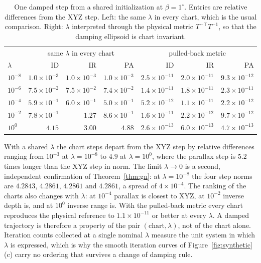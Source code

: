 \documentclass[11pt,a4paper]{article}
\theoremstyle{definition}
\theoremstyle{remark}
\begin{document}
\begin{table}[t]
\centering
\caption{One damped step from a shared initialization at $\beta=1^\circ$. Entries are relative differences from the XYZ step. Left: the same $\lambda$ in every chart, which is the usual comparison. Right: $\lambda$ interpreted through the physical metric $T^{-\top}T^{-1}$, so that the damping ellipsoid is chart invariant.}
\label{tab:damping}
\small
\begin{tabular}{lrrrrrr}
\toprule
& \multicolumn{3}{c}{same $\lambda$ in every chart} & \multicolumn{3}{c}{pulled-back metric}\\
\cmidrule(lr){2-4}\cmidrule(lr){5-7}
$\lambda$ & ID & IR & PA & ID & IR & PA\\
\midrule
$10^{-8}$ & $1.0\times10^{-3}$ & $1.0\times10^{-3}$ & $1.0\times10^{-3}$ & $2.5\times10^{-11}$ & $2.0\times10^{-11}$ & $9.3\times10^{-12}$\\
$10^{-6}$ & $7.5\times10^{-2}$ & $7.5\times10^{-2}$ & $7.4\times10^{-2}$ & $1.4\times10^{-11}$ & $1.8\times10^{-11}$ & $2.3\times10^{-11}$\\
$10^{-4}$ & $5.9\times10^{-1}$ & $6.0\times10^{-1}$ & $5.0\times10^{-1}$ & $5.2\times10^{-12}$ & $1.1\times10^{-11}$ & $2.2\times10^{-12}$\\
$10^{-2}$ & $7.8\times10^{-1}$ & $1.27$ & $8.6\times10^{-1}$ & $1.6\times10^{-11}$ & $2.2\times10^{-12}$ & $9.7\times10^{-12}$\\
$10^{0}$ & $4.15$ & $3.00$ & $4.88$ & $2.6\times10^{-13}$ & $6.0\times10^{-13}$ & $4.7\times10^{-13}$\\
\bottomrule
\end{tabular}
\end{table}

With a shared $\lambda$ the chart steps depart from the XYZ step by relative differences ranging from $10^{-3}$ at $\lambda=10^{-8}$ to $4.9$ at $\lambda=10^{0}$, where the parallax step is $5.2$ times longer than the XYZ step in norm. The limit $\lambda\to0$ is a second, independent confirmation of Theorem~\ref{thm:gn}: at $\lambda=10^{-8}$ the four step norms are $4.2843$, $4.2861$, $4.2861$ and $4.2861$, a spread of $4\times10^{-4}$. The ranking of the charts also changes with $\lambda$: at $10^{-4}$ parallax is closest to XYZ, at $10^{-2}$ inverse depth is, and at $10^{0}$ inverse range is. With the pulled-back metric every chart reproduces the physical reference to $1.1\times10^{-11}$ or better at every $\lambda$. A damped trajectory is therefore a property of the pair $(\text{chart},\lambda)$, not of the chart alone. Iteration counts collected at a single nominal $\lambda$ measure the unit system in which $\lambda$ is expressed, which is why the smooth iteration curves of Figure~\ref{fig:synthetic}(c) carry no ordering that survives a change of damping rule.
\end{document}
